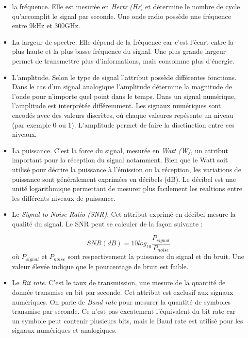 \vspace{0.1cm}

\begin{itemize}



\item la fréquence. Elle est mesurée en \textit{Hertz (Hz}) et détermine le nombre de cycle qu'accomplit le signal par seconde. Une onde radio possède une fréquence entre 9kHz et 300GHz.

\item La largeur de spectre. Elle dépend de la fréquence car c'est l'écart entre la plus haute et la plus basse fréquence du signal. Une plus grande largeur permet de transmettre plus d'informations, mais consomme plus d'énergie.

\item L'amplitude. Selon le type de signal l'attribut possède différentes fonctions. Dans le cas d'un signal analogique l'amplitude détermine la magnitude de l'onde pour n'importe quel point dans le temps. Dans un signal numérique, l'amplitude est interprétée différemment. Les signaux numériques sont encodés avec des valeurs discrètes, où chaque valeures repésente un niveau (par exemple 0 ou 1). L'amplitude permet de faire la disctinction entre ces niveaux.

\item La puissance. C'est la force du signal, mesurée en \textit{Watt (W)}, un attribut important pour la réception du signal notamment. Bien que le Watt soit utilisé pour décrire la puissance à l'émission ou la réception, les variations de puissance sont généralement exprimées en décibels (dB). Le décibel est une unité logarithmique permettant de mesurer plus facilement les realtions entre les différents niveaux de puissance.

\item Le \textit{Signal to Noise Ratio (SNR)}. Cet attribut exprimé en décibel mesure la qualité du signal. Le SNR peut se calculer de la façon suivante : 

\begin{equation}\label{eq0}
SNR(dB) = 10log_{10} \frac{P_{signal}}{P_{noise}}
\end{equation}
où $P_{signal}$ et $P_{noise}$ sont respectivement la puissance du signal et du bruit. Une valeur élevée indique que le pourcentage de bruit est faible. 


\item Le \textit{Bit rate}. C'est le taux de transmission, une mesure de la quantité de donnée transmise en bit par seconde. Cet attribut est exclusif aux signaux numériques. On parle de \textit{Baud rate} pour mesurer la quantité de symboles transmise par seconde. Ce n'est pas excatement l'équivalent du bit rate car un symbole peut contenir plusieurs bits, mais le Baud rate est utilisé pour les signaux numériques et analogiques.

\end{itemize}


